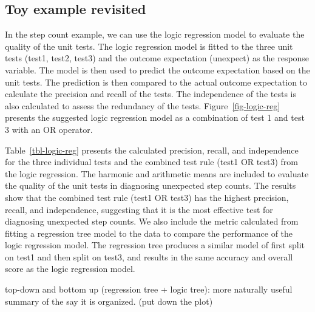 \documentclass[
  12pt,
]{interact}
\begin{document}
\subsection{Toy example revisited}\label{toy-example-revisited}

In the step count example, we can use the logic regression model to
evaluate the quality of the unit tests. The logic regression model is
fitted to the three unit tests (test1, test2, test3) and the outcome
expectation (unexpect) as the response variable. The model is then used
to predict the outcome expectation based on the unit tests. The
prediction is then compared to the actual outcome expectation to
calculate the precision and recall of the tests. The independence of the
tests is also calculated to assess the redundancy of the tests.
Figure~\ref{fig-logic-reg} presents the suggested logic regression model
as a combination of test 1 and test 3 with an OR operator.

Table~\ref{tbl-logic-reg} presents the calculated precision, recall, and
independence for the three individual tests and the combined test rule
(test1 OR test3) from the logic regression. The harmonic and arithmetic
means are included to evaluate the quality of the unit tests in
diagnosing unexpected step counts. The results show that the combined
test rule (test1 OR test3) has the highest precision, recall, and
independence, suggesting that it is the most effective test for
diagnosing unexpected step counts. We also include the metric calculated
from fitting a regression tree model to the data to compare the
performance of the logic regression model. The regression tree produces
a similar model of first split on test1 and then split on test3, and
results in the same accuracy and overall score as the logic regression
model.

top-down and bottom up (regression tree + logic tree): more naturally
useful summary of the say it is organized. (put down the plot)
\end{document}
